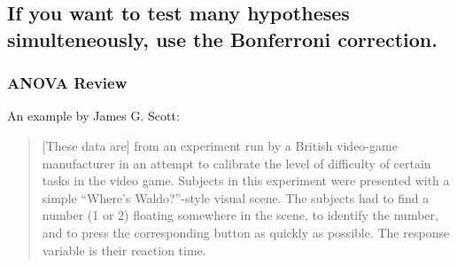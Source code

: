 \documentclass[slidestop,compress,mathserif,12pt,t,professionalfonts,xcolor=table]{beamer}
\newcommand{\ftest}{You can use another version of the $F$-test to compare grouping by 2 variables vs. grouping by 1 variable}
\newcommand{\bonferroni}{If you want to test many hypotheses simulteneously, use
  the Bonferroni correction.}
\begin{document}
















\subsection{\bonferroni}
\label{mi1}

\begin{frame}
  \frametitle{ANOVA Review}

\vfill

An example by James G. Scott:
\begin{quote} 
[These data are] from an experiment run by a British video-game manufacturer in an attempt to calibrate the level of difficulty of certain tasks in the video game. Subjects in this experiment were presented with a simple “Where’s Waldo?”-style visual scene. The subjects had to find a number (1 or 2) floating somewhere in the scene, to identify the number, and to press the corresponding button as quickly as possible. The response variable is their reaction time.
\end{quote}

\vfill

\end{frame}
\end{document}

